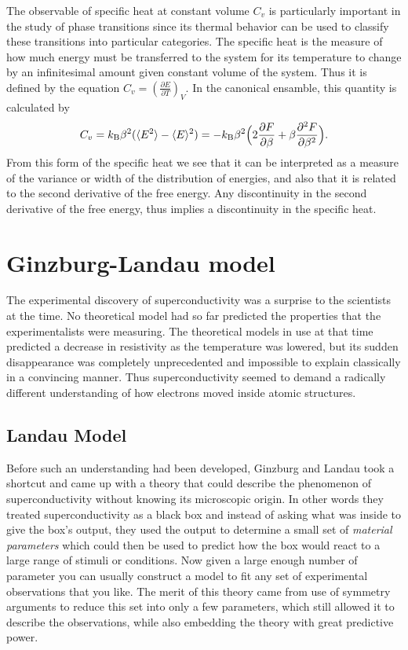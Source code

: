 The observable of specific heat at constant volume $C_v$ is particularly important in the study of phase transitions
since its thermal
behavior can be used to classify these transitions into particular categories. The specific heat is the measure
of how much energy must be transferred to the system for its temperature to change by an infinitesimal amount
given constant volume of the system. Thus it is defined by the equation $C_v = (\frac{\partial E}{\partial T})_V$.
In the canonical ensamble, this quantity is calculated by
\begin{equation}
    \label{eq:statMech:specificHeat}
    C_v = k_\text{B}\beta^2(\langle E^2 \rangle-\langle E \rangle^2) = -k_\text{B}\beta^2\Big(2\frac{\partial F}{\partial\beta}+\beta\frac{\partial^2 F}{\partial\beta^2}\Big).
\end{equation}
From this form of the specific heat we see that it can be interpreted as a measure of the variance or width of the
distribution of energies, and also that it is related to the second derivative of the free energy. Any discontinuity
in the second derivative of the free energy, thus implies a discontinuity in the specific heat.

\section{Ginzburg-Landau model}

The experimental discovery of superconductivity was a surprise to the scientists at the time. No theoretical model
had so far predicted the properties that the experimentalists were measuring. The theoretical models in use at that
time predicted a decrease in resistivity as the temperature was lowered, but its sudden disappearance was completely
unprecedented and impossible to explain classically in a convincing manner. Thus superconductivity seemed to demand
a radically different understanding of how electrons moved inside atomic structures.

\subsection{Landau Model}

Before such an understanding had been developed, Ginzburg and Landau took a shortcut and came up with a theory
that could describe the phenomenon of superconductivity without knowing its microscopic origin. In other words
they treated superconductivity as a black box and instead of asking what was inside to give the box's output,
they used the output to determine a small set of \emph{material parameters} which could then be used to predict
how the box would react to a large range of stimuli or conditions. Now given a large enough number of parameter
you can usually construct a model to fit any set of experimental observations that you like. The merit of this theory
came from use of symmetry arguments to reduce this set into only a few parameters, which still allowed it to describe the
observations, while also embedding the theory with great predictive power.

